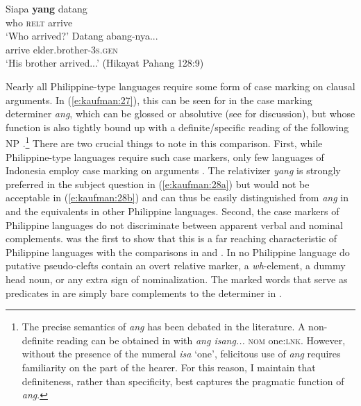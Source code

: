 \documentclass[output=paper]{langsci/langscibook}
\begin{document}
\begin{exe}
	\ex\label{e:kaufman:28}
	\begin{xlist}
		\ex\label{e:kaufman:28a}
        \gll Siapa \textbf{yang} datang{\USQMark}\\
		who \textsc{relt} arrive\\
		\glt `Who arrived?'
		\ex\label{e:kaufman:28b}
        \gll Datang abang-nya...\\
		arrive elder.brother-\textsc{3s.gen}\\
		\glt `His brother arrived...' 	{(Hikayat Pahang 128:9)}
	\end{xlist}
\end{exe}

\noindent\largerpage
Nearly all Philippine-type languages require some form of case marking on clausal arguments. In (\ref{e:kaufman:27}), this can be seen for  in the case marking determiner \textit{ang}, which can be glossed  or absolutive (see \citealt{Kaufman:2015a} for discussion), but whose function is also tightly bound up with a definite/specific reading of the following NP \citep{Himmelmann:1997}.\footnote{The precise semantics of \textit{ang} has been debated in the literature. A non-definite reading can be obtained in  with \textit{ang isang...} \textsc{nom} one:\textsc{lnk}. However, without the presence of the numeral \textit{isa} `one', felicitous use of \textit{ang} requires familiarity on the part of the hearer. For this reason, I maintain that definiteness, rather than specificity, best captures the pragmatic function of \textit{ang}.} There are two crucial things to note in this comparison. First, while Philippine-type languages require such case markers,  only few  languages of Indonesia employ case marking on arguments \citep[see][]{Himmelmann:2005}. The relativizer \textit{yang} is strongly preferred in the subject question in (\ref{e:kaufman:28a}) but would not be acceptable in (\ref{e:kaufman:28b}) and can thus be easily distinguished from \textit{ang} in  and the equivalents in other Philippine languages. Second, the case markers of Philippine languages do not discriminate between apparent verbal and nominal complements. \citet{Constantino:1965} was the first to show that this is a far reaching characteristic of Philippine languages with the comparisons in  and  . In no Philippine language do putative pseudo-clefts contain an overt relative marker, a \textit{wh}-element, a dummy head noun, or any extra sign of nominalization. The  marked words that serve as predicates in   are simply bare complements to the determiner in  . 
\end{document}
